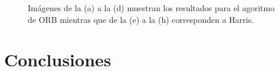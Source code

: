 \documentclass[]{report}
\begin{document}
\begin{figure}
{    \label{fig:subfig1}
}
\caption{Imágenes de la (a) a la (d) muestran los resultados para el agoritmo de ORB mientras que de la (e) a la (h) corresponden a Harris.}
\label{fig:orb_harris}
\end{figure}






\chapter{Conclusiones}
\end{document}
